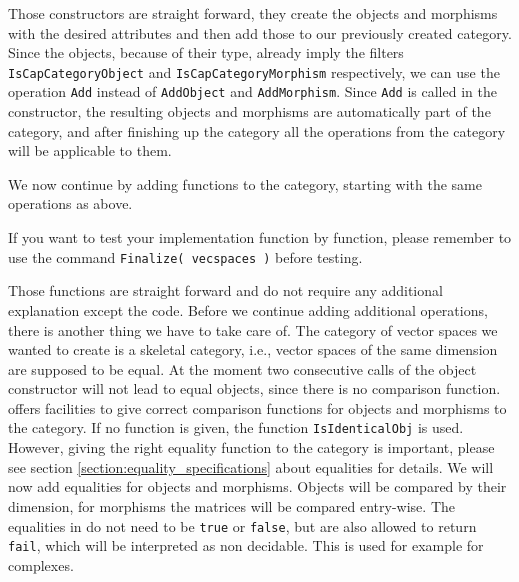 

Those constructors are straight forward, they create the objects and morphisms with the desired attributes and then
add those to our previously created category. Since the objects, because of their type, already imply the \GAP filters
\texttt{IsCapCategoryObject} and \texttt{IsCapCategoryMorphism} respectively, we can use the operation \texttt{Add} instead
of \texttt{AddObject} and \texttt{AddMorphism}. Since \texttt{Add} is called in the constructor, the resulting objects and
morphisms are automatically part of the category, and after finishing up the category all the operations from the
category will be applicable to them.

We now continue by adding functions to the category, starting with the same operations as above.

If you want to test your implementation function by function,
please remember to use the command \texttt{Finalize( vecspaces )}
before testing. 



Those functions are straight forward and do not require any additional explanation except the code. Before we continue
adding additional operations, there is another thing we have to take care of. The category of vector spaces we wanted
to create is a skeletal category, i.e., vector spaces of the same dimension are supposed to be equal. At the moment
two consecutive calls of the object constructor will not lead to equal objects, since there is no comparison function.
\CapPkg offers facilities to give correct comparison functions for objects and morphisms to the category. If no function
is given, the \GAP function \texttt{IsIdenticalObj} is used. However, giving the right equality function to the
category is important, please see section \ref{section:equality_specifications} about equalities for details. We will now add equalities
for objects and morphisms. Objects will be compared by their dimension, for morphisms the matrices will be compared entry-wise.
The equalities in \CapPkg do not need to be \texttt{true} or \texttt{false}, but are also allowed to return \texttt{fail},
which will be interpreted as non decidable. This is used for example for complexes.



